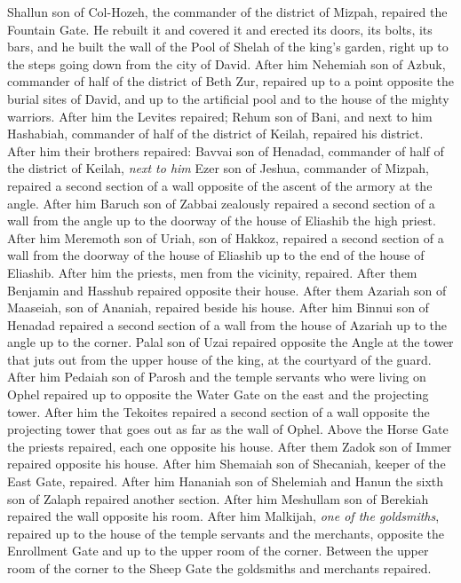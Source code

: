 \begin{biblechapter}
\verse Shallun son of Col-Hozeh, the commander of the district of Mizpah, repaired the Fountain Gate. He rebuilt it and covered it and erected its doors, its bolts, its bars, and he built the wall of the Pool of Shelah of the king’s garden, right up to the steps going down from the city of David.
\verse After him Nehemiah son of Azbuk, commander of half of the district of Beth Zur, repaired up to a point opposite the burial sites of David, and up to the artificial pool and to the house of the mighty warriors.
\verse After him the Levites repaired; Rehum son of Bani, and next to him Hashabiah, commander of half of the district of Keilah, repaired his district.
\verse After him their brothers repaired: Bavvai son of Henadad, commander of half of the district of Keilah,
\verse \textit{next to him} Ezer son of Jeshua, commander of Mizpah, repaired a second section of a wall opposite of the ascent of the armory at the angle.
\verse After him Baruch son of Zabbai zealously repaired a second section of a wall from the angle up to the doorway of the house of Eliashib the high priest.
\verse After him Meremoth son of Uriah, son of Hakkoz, repaired a second section of a wall from the doorway of the house of Eliashib up to the end of the house of Eliashib.
\verse After him the priests, men from the vicinity, repaired.
\verse After them Benjamin and Hasshub repaired opposite their house. After them Azariah son of Maaseiah, son of Ananiah, repaired beside his house.
\verse After him Binnui son of Henadad repaired a second section of a wall from the house of Azariah up to the angle up to the corner.
\verse Palal son of Uzai repaired opposite the Angle at the tower that juts out from the upper house of the king, at the courtyard of the guard. After him Pedaiah son of Parosh
\verse and the temple servants who were living on Ophel repaired up to opposite the Water Gate on the east and the projecting tower.
\verse After him the Tekoites repaired a second section of a wall opposite the projecting tower that goes out as far as the wall of Ophel.
\verse Above the Horse Gate the priests repaired, each one opposite his house.
\verse After them Zadok son of Immer repaired opposite his house. After him Shemaiah son of Shecaniah, keeper of the East Gate, repaired.
\verse After him Hananiah son of Shelemiah and Hanun the sixth son of Zalaph repaired another section. After him Meshullam son of Berekiah repaired the wall opposite his room.
\verse After him Malkijah, \textit{one of the goldsmiths}, repaired up to the house of the temple servants and the merchants, opposite the Enrollment Gate and up to the upper room of the corner.
\verse Between the upper room of the corner to the Sheep Gate the goldsmiths and merchants repaired.
\end{biblechapter}

